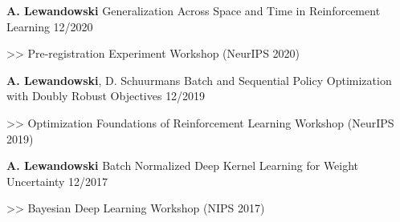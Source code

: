 \begin{cventries}
    \cventry
    { \textbf{A. Lewandowski}}
    {Generalization Across Space and Time in Reinforcement Learning}
    {12/2020}
    {
      \begin{cvitems}
    	\item[>>] Pre-registration Experiment Workshop (NeurIPS 2020)
      \end{cvitems}
    }

    \cventry
    { \textbf{A. Lewandowski}, D. Schuurmans}
    {Batch and Sequential Policy Optimization with Doubly Robust Objectives}
    {12/2019}
    {
      \begin{cvitems}
    	\item[>>] Optimization Foundations of Reinforcement Learning Workshop (NeurIPS 2019)
      \end{cvitems}
    }


  \cventry
    {\textbf{A. Lewandowski}}
    {Batch Normalized Deep Kernel Learning for Weight Uncertainty}
    {12/2017}
    {
      \begin{cvitems}
    	\item[>>] Bayesian Deep Learning Workshop (NIPS 2017)
      \end{cvitems}
    }
  \end{cventries}

% 
% 
